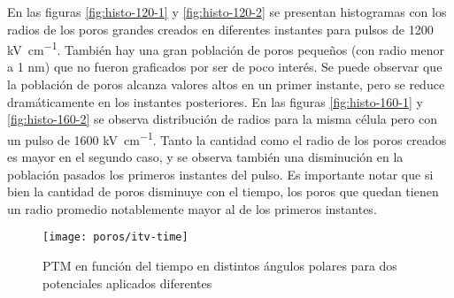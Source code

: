 En las figuras \ref{fig:histo-120-1} y \ref{fig:histo-120-2} se presentan histogramas con los radios de los poros grandes creados en diferentes instantes para pulsos de 1200 \si{\kilo\volt\per\centi\metre}. También hay una gran población de poros pequeños (con radio menor a 1 \si{\nano\metre}) que no fueron graficados por ser de poco interés. Se puede observar que la población de poros alcanza valores altos en un primer instante, pero se reduce dramáticamente en los instantes posteriores. En las figuras \ref{fig:histo-160-1} y \ref{fig:histo-160-2} se observa distribución de radios para la misma célula pero con un pulso de 1600 \si{\kilo\volt\per\centi\metre}. Tanto la cantidad como el radio de los poros creados es mayor en el segundo caso, y se observa también una disminución en la población pasados los primeros instantes del pulso. Es importante notar que si bien la cantidad de poros disminuye con el tiempo, los poros que quedan tienen un radio promedio notablemente mayor al de los primeros instantes.

\begin{figure}
	\texttt{[image: poros/itv-time]}
	\caption{PTM en función del tiempo en distintos ángulos polares para dos potenciales aplicados diferentes}
	\label{fig:itv-time}
\end{figure}



